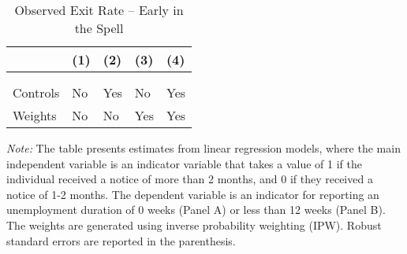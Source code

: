 \documentclass{div}
\newcommand{\outdir}{./../output}
\begin{document}
\begin{table}[t]
\begin{threeparttable}
\caption{Observed Exit Rate -- Early in the Spell}\label{tab_init_hazard}
\begin{tabularx}{\textwidth}{p{}YYYY}
\toprule
& (1) & (2) & (3) & (4) \\
\midrule \addlinespace[1ex]
 \\ \addlinespace[2ex]
 \addlinespace[3ex]
 \\ \addlinespace[2ex]
 \addlinespace[2ex]
Controls   &  No & Yes  & No & Yes \\
Weights   & No  & No   & Yes & Yes \\
\midrule

\bottomrule
\end{tabularx}
\begin{tablenotes}
\item \textit{Note:} The table presents estimates from linear regression models, where the main independent variable is an indicator variable that takes a value of 1 if the individual received a notice of more than 2 months, and 0 if they received a notice of 1-2 months. The dependent variable is an indicator for reporting an unemployment duration of 0 weeks (Panel A) or less than 12 weeks (Panel B). The weights are generated using inverse probability weighting (IPW). Robust standard errors are reported in the parenthesis. 
\end{tablenotes}
\end{threeparttable}
\end{table}


\end{document}
